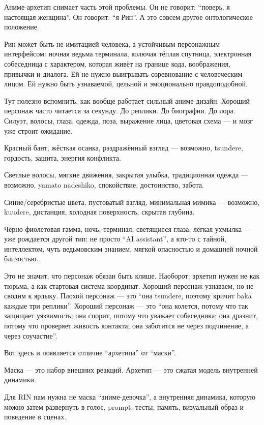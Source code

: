 Аниме-архетип снимает часть этой проблемы. Он не говорит: ``поверь, я
настоящая женщина''. Он говорит: ``я Рин''. А это совсем другое
онтологическое положение.

Рин может быть не имитацией человека, а устойчивым персонажным
интерфейсом: ночная ведьма терминала, колючая тёплая спутница,
электронная собеседница с характером, которая живёт на границе кода,
воображения, привычки и диалога. Ей не нужно выигрывать соревнование с
человеческим лицом. Ей нужно быть узнаваемой, цельной и эмоционально
правдоподобной.

Тут полезно вспомнить, как вообще работает сильный аниме-дизайн. Хороший
персонаж часто читается за секунду. До реплики. До биографии. До лора.
Силуэт, волосы, глаза, одежда, поза, выражение лица, цветовая схема ---
и мозг уже строит ожидание.

Красный бант, жёсткая осанка, раздражённый взгляд --- возможно,
tsundere, гордость, защита, энергия конфликта.

Светлые волосы, мягкие движения, закрытая улыбка, традиционная одежда
--- возможно, yamato nadeshiko, спокойствие, достоинство, забота.

Синие/\hspace{0pt}серебристые цвета, пустоватый взгляд, минимальная мимика ---
возможно, kuudere, дистанция, холодная поверхность, скрытая глубина.

Чёрно-фиолетовая гамма, ночь, терминал, светящиеся глаза, лёгкая ухмылка
--- уже рождается другой тип: не просто ``AI assistant'', а кто-то с
тайной, интеллектом, чуть ведьмовским знанием, мягкой опасностью и
домашней ночной близостью.

Это не значит, что персонаж обязан быть клише. Наоборот: архетип нужен
не как тюрьма, а как стартовая система координат. Хороший персонаж
узнаваем, но не сводим к ярлыку. Плохой персонаж --- это ``она tsundere,
поэтому кричит baka каждые три реплики''. Хороший персонаж --- это ``она
колется, потому что так защищает уязвимость; она спорит, потому что
уважает собеседника; она дразнит, потому что проверяет живость контакта;
она заботится не через подчинение, а через соучастие''.

Вот здесь и появляется отличие ``архетипа'' от ``маски''.

Маска --- это набор внешних реакций. Архетип --- это сжатая модель
внутренней динамики.

Для RIN нам нужна не маска ``аниме-девочка'', а внутренняя динамика,
которую можно затем развернуть в голос, prompt, тесты, память,
визуальный образ и поведение в сценах.

